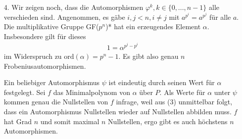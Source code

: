 \begin{solution}
\begin{itemize}
    \item[4.] Wir zeigen noch, dass die Automorphismen $\varphi^k, k \in \{0, ..., n-1\}$ alle verschieden sind. Angenommen, es gäbe $i, j < n, i \neq j$ mit $a^{p^i} = a^{p^j}$ für alle $a.$ Die multiplikative Gruppe GF($p^n$)* hat ein erzeugendes Element $\alpha.$ Insbesondere gilt für dieses
    \begin{align}
        1 = \alpha^{p^j - p^i}
    \end{align}
    im Widerspruch zu $\mathrm{ord}(\alpha) = p^n - 1$. Es gibt also genau $n$ Frobeniusautomorphismen.

    Ein beliebiger Automorphismus $\psi$ ist eindeutig durch seinen Wert für $\alpha$ festgelegt. Sei $f$ das Minimalpolynom von $\alpha$ über $P.$ Als Werte für $\alpha$ unter $\psi$ kommen genau die Nullstellen von $f$ infrage, weil aus (3) unmittelbar folgt, dass ein Automorphismus Nullstellen wieder auf Nullstellen abbilden muss. $f$ hat Grad $n$ und somit maximal $n$ Nullstellen, ergo gibt es auch höchstens $n$ Automorphismen.
  \end{itemize}
\end{solution}
